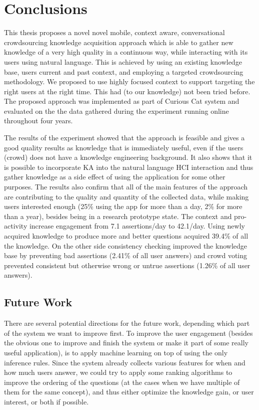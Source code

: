 % 
\chapter{Conclusions}
\label{chapter:conclusions}
This thesis proposes a novel novel mobile, context aware,
conversational crowdsourcing knowledge acquisition approach which is able to 
gather new knowledge of a very high quality in a continuous way, while 
interacting with its users using natural language. This is achieved by using an
existing knowledge base, users current and past context, and employing a 
targeted crowdsourcing methodology. We proposed to use highly focused context 
to support targeting the right users 
at the right time. This had (to our knowledge) not been tried before. The
proposed approach was implemented as part of Curious Cat system and evaluated 
on the the data gathered during the experiment running online throughout four 
years. 

The results of the experiment showed that the approach is feasible and gives a 
good quality results as knowledge that is immediately useful, even if the users 
(crowd) does not have a knowledge engineering background. It also shows that
it is possible to incorporate KA into the natural language HCI interaction and 
thus gather knowledge as a side effect of using the application for some other
purposes. The results also confirm that all of the main features 
of the approach are contributing to the quality and quantity of the collected 
data, while making users interested enough (25\% using the app for more than a 
day, 2\% for more than a year), besides being in a research prototype state. 
The context and pro-activity increase engagement from 7.1 assertions/day to 
42.1/day. Using newly acquired knowledge to produce more and better questions 
acquired 39.4\% of all the knowledge. On the other side consistency checking 
improved the knowledge base by preventing bad assertions (2.41\% of all user 
answers) and crowd voting prevented consistent but otherwise wrong or untrue 
assertions (1.26\% of all user answers).

\section{Future Work}
There are several potential directions for the future work, depending which 
part of the system we want to improve first. 
To improve the user engagement (besides the obvious one to improve and finish
the system or make it part of some really useful application), is to apply
machine learning on top of using the only inference rules. Since the system
already collects various features for when and how much users answer, we could
try to apply some ranking algorithms to improve the ordering of the questions 
(at the cases when we have multiple of them for the same concept), and thus
either optimize the knowledge gain, or user interest, or both if possible.

